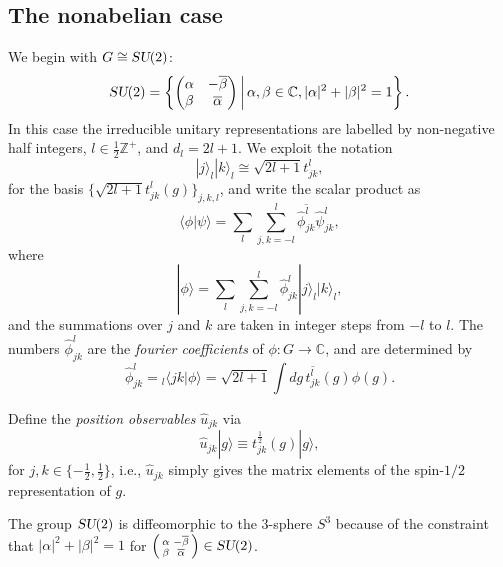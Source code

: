 \documentclass[12pt]{amsart}
\def\su2{\textsl{SU}(2)}
\theoremstyle{definition}
\theoremstyle{remark}
\numberwithin{equation}{section}
\begin{document}
\subsection{The nonabelian case}
We begin with $G\cong \su2$:
\begin{equation}
	\su2 = \left\{\begin{pmatrix} \alpha & -\overline{\beta} \\ \beta & \overline{\alpha}\end{pmatrix}\,\middle|\, \alpha,\beta\in \mathbb{C}, |\alpha|^2+|\beta|^2 = 1\right\}.
\end{equation}
In this case the irreducible unitary representations are labelled by non-negative half integers, $l \in \frac12\mathbb{Z}^+$, and $d_l = 2l+1$.
We exploit the notation
\begin{equation}
	|j\rangle_l|k\rangle_l \cong \sqrt{2l+1} t_{jk}^l,
\end{equation}
for the basis $\{\sqrt{2l+1} t_{jk}^l(g)\}_{j,k,l}$, and write the scalar product as
\begin{equation}
	\langle \phi|\psi\rangle = \sum_{l}\sum_{j,k = -l}^l \overline{\widehat{\phi}_{jk}^l}\widehat{\psi}_{jk}^l,
\end{equation}
where 
\begin{equation}
	|\phi\rangle = \sum_{l}\sum_{j,k=-l}^l\widehat{\phi}_{jk}^l |j\rangle_l|k\rangle_l,
\end{equation}
and the summations over $j$ and $k$ are taken in integer steps from $-l$ to $l$. The numbers $\widehat{\phi}_{jk}^l$ are the \emph{fourier coefficients} of $\phi:G\rightarrow \mathbb{C}$, and are determined by
\begin{equation}
	\widehat{\phi}_{jk}^l = {_l\langle jk|\phi\rangle} = \sqrt{2l+1}\int dg \, \overline{t^l_{jk}}(g) \phi(g).
\end{equation}

Define the \emph{position observables} $\widehat{u}_{jk}$ via
\begin{equation}
	\widehat{u}_{jk}|g\rangle \equiv t_{jk}^{\frac12}(g)|g\rangle,
\end{equation} 
for $j,k \in \{-\frac12, \frac12\}$, i.e., $\widehat{u}_{jk}$ simply gives the matrix elements of the spin-$1/2$ representation of $g$.

The group $\su2$ is diffeomorphic to the $3$-sphere $S^3$ because of the constraint that $|\alpha|^2 + |\beta|^2 = 1$ for $\left(\begin{smallmatrix}\alpha & -\overline{\beta} \\ \beta & \overline{\alpha} \end{smallmatrix}\right) \in \su2$. 
\end{document}
